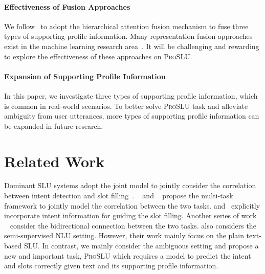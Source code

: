 \documentclass[letterpaper]{article} \usepackage{aaai22}  \usepackage{times}  \usepackage{helvet}  \usepackage{courier}  \usepackage[hyphens]{url}  \usepackage{graphicx} \urlstyle{rm} \def\UrlFont{\rm}  \usepackage{natbib}  \usepackage{caption} \DeclareCaptionStyle{ruled}{labelfont=normalfont,labelsep=colon,strut=off} \frenchspacing  \setlength{\pdfpagewidth}{8.5in}  \setlength{\pdfpageheight}{11in}  \usepackage{algorithm}
\begin{document}
\paragraph{Effectiveness of Fusion Approaches}
We follow~\citet{libovicky-helcl-2017-attention} to adopt the hierarchical attention fusion mechanism to fuse three types of supporting profile information.
Many representation fusion approaches exist in the machine learning research area~\citep{zadeh-etal-2017-tensor, liu-etal-2018-efficient, tsai-etal-2019-multimodal}.
It will be challenging and rewarding to explore the effectiveness of these approaches on \textsc{ProSLU}.

\paragraph{Expansion of Supporting Profile Information}
In this paper, we investigate three types of supporting profile information, which is common in real-world scenarios. 
To better solve \textsc{ProSLU} task and alleviate ambiguity from user utterances, more types of supporting profile information can be expanded in future research.
 \section{Related Work}
\label{related work}
Dominant SLU systems adopt the joint model to jointly consider the correlation between intent detection and slot filling~\cite{ijcai2021-622}. 
~\citet{zhang2016joint} and ~\citet{hakkani2016multi} propose the multi-task framework to jointly model the correlation between the two tasks.
\citet{goo-etal-2018-slot,qin-etal-2019-stack} and~\citet{Teng2021InjectingWI} explicitly incorporate intent information for guiding the slot filling.
Another series of work ~\citep{li-etal-2018-self,e-etal-2019-novel, qin2021co} consider the bidirectional connection between the two tasks.
\citet{zhu2020dual} also considers the semi-supervised NLU setting.
However, their work mainly focus on the plain text-based SLU. In contrast, we mainly consider the ambiguous setting and propose a new and important task, \textsc{ProSLU} which requires a model to predict the intent and slots correctly given text and its supporting profile information. 
\end{document}
